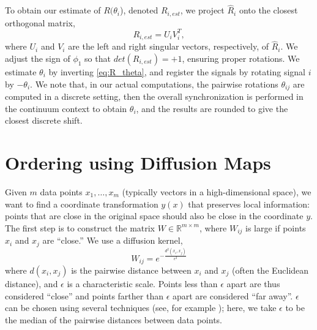 \documentclass{pnastwo}
\begin{document}
\begin{article}
\begin{materials}
%
To obtain our estimate of $R(\theta_i$), denoted $R_{i, est}$, we project $\hat{R}_i$ onto the closest orthogonal matrix, 
\begin{equation} \label{eq:R_est}
R_{i, est} = U_i V_i^T,
\end{equation}
where $U_i$ and $V_i$ are the left and right singular vectors, respectively, of $\hat{R}_i$.
%
We adjust the sign of $\phi_1$ so that $det(R_{i, est}) = +1$, ensuring proper rotations.
%
We estimate $\theta_{i}$ by inverting \eqref{eq:R_theta}, and register the signals by rotating signal $i$ by $-\theta_i$.
%
We note that, in our actual computations, the pairwise rotations $\theta_{ij}$ are computed in a discrete setting, then the overall
synchronization is performed in the continuum context to obtain $\theta_i$, and the results are rounded to give the closest
discrete shift.

%
%
%

\section{Ordering using Diffusion Maps \cite{coifman2005geometric}}

Given $m$ data points $x_1, \dots, x_m$ (typically vectors in a high-dimensional space), we want to find a coordinate transformation $y(x)$ that preserves local information: points that are close in the original space should also be close in the coordinate $y$.
%
The first step is to construct the matrix $W \in \mathbb{R}^{m \times m}$, where $W_{ij}$ is large if points $x_i$ and $x_j$ are ``close.''
%
We use a diffusion kernel,
\begin{equation} \label{eq:dmaps_W}
W_{ij} = e^{ -\frac{d^2(x_i, x_j)}{\epsilon^2}}
\end{equation}
where $d(x_i, x_j)$ is the pairwise distance between $x_i$ and $x_j$ (often the Euclidean distance), and $\epsilon$ is a characteristic scale.
%
Points less than $\epsilon$ apart are thus considered ``close'' and points farther than $\epsilon$ apart are considered ``far away''.
%
$\epsilon$ can be chosen using several techniques (see, for example \cite{coifman2008graph}); here, we take $\epsilon$ to be the median of the pairwise distances between data points.


\end{materials}
\end{article}
\end{document}
